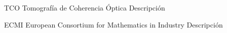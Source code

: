 
  {TCO}            %
  {Tomografía de Coherencia Óptica}  %
  {Descripción} %

  {ECMI}            %
  {European Consortium for Mathematics in Industry}  %
  {Descripción} %
